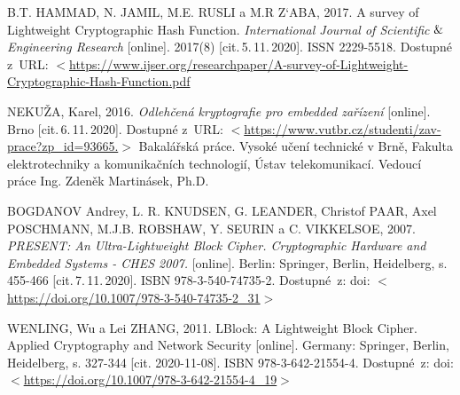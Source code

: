 \begin{thebibliography}{99}
    B.T. HAMMAD, N. JAMIL, M.E. RUSLI a M.R Z`ABA, 
    2017. 
    A survey of Lightweight Cryptographic Hash Function. 
    \emph{International Journal of Scientific\(\And\)Engineering Research} 
    [online]. 
    2017(8) 
    [cit.\,5.\,11.\,2020]. 
    ISSN 2229-5518. 
    Dostupné z~URL: \(<\)\url{https://www.ijser.org/researchpaper/A-survey-of-Lightweight-Cryptographic-Hash-Function.pdf}

    \label{source:NekuzaBP}
    NEKUŽA, Karel, 
    2016. 
    \emph{Odlehčená kryptografie pro embedded zařízení} 
    [online]. 
    Brno 
    [cit.\,6.\,11.\,2020].
    Dostupné z~URL: \(<\)\url{https://www.vutbr.cz/studenti/zav-prace?zp_id=93665.}\(>\)
    Bakalářská práce. 
    Vysoké učení technické v Brně, 
    Fakulta elektrotechniky a komunikačních technologií, Ústav telekomunikací. 
    Vedoucí práce Ing. Zdeněk Martinásek, Ph.D.
   
    \label{source:PRESENT}
    BOGDANOV Andrey, L. R. KNUDSEN, G. LEANDER, Christof PAAR, Axel POSCHMANN, M.J.B. ROBSHAW, Y. SEURIN a C. VIKKELSOE, 
    2007. 
    \emph{PRESENT: An Ultra-Lightweight Block Cipher. Cryptographic Hardware and Embedded Systems - CHES 2007.}
    [online]. 
    Berlin: Springer, Berlin, Heidelberg, 
    s. 455-466 
    [cit.\,7.\,11.\,2020]. 
    ISBN 978-3-540-74735-2. 
    Dostupné~z: doi: \(<\)\url{https://doi.org/10.1007/978-3-540-74735-2_31}\(>\)
    
    \label{source:lblock}
    WENLING, Wu a Lei ZHANG, 
    2011.
    LBlock: A Lightweight Block Cipher. Applied Cryptography and Network Security 
    [online]. 
    Germany: Springer, Berlin, Heidelberg, 
    s. 327-344 
    [cit. 2020-11-08]. 
    ISBN 978-3-642-21554-4. 
    Dostupné~z: doi: \(<\)\url{https://doi.org/10.1007/978-3-642-21554-4_19}\(>\)

\end{thebibliography}


%
%
%
